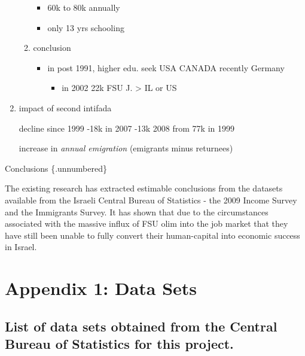 \documentclass[12pt,twoside]{reedthesis}
\providecommand{\tightlist}{%
  \setlength{\itemsep}{0pt}\setlength{\parskip}{0pt}}
\begin{document}
\begin{enumerate}
\begin{enumerate}
      \begin{itemize}
      \tightlist
      \item
        60k to 80k annually
      \item
        only 13 yrs schooling
      \end{itemize}
    \item
      conclusion
  
      \begin{itemize}
      \tightlist
      \item
        in post 1991, higher edu. seek USA CANADA recently Germany
  
        \begin{itemize}
        \tightlist
        \item
          in 2002 22k FSU J. \textgreater{} IL or US
        \end{itemize}
      \end{itemize}
    \end{enumerate}
  \item
    impact of second intifada
  
    decline since 1999 -18k in 2007 -13k 2008 from 77k in 1999
  
    increase in \emph{annual emigration} (emigrants minus returnees)
  \end{enumerate}
  
  Conclusions \{.unnumbered\}
  
  The existing research has extracted estimable conclusions from the
  datasets available from the Israeli Central Bureau of Statistics - the
  2009 Income Survey and the Immigrants Survey. It has shown that due to
  the circumstances associated with the massive influx of FSU olim into
  the job market that they have still been unable to fully convert their
  human-capital into economic success in Israel.
  
  \chapter*{Appendix 1: Data Sets}\label{appendix-1-data-sets}
  
  \section{List of data sets obtained from the Central Bureau of
  Statistics for this
  project.}\label{list-of-data-sets-obtained-from-the-central-bureau-of-statistics-for-this-project.}
  
\end{document}
